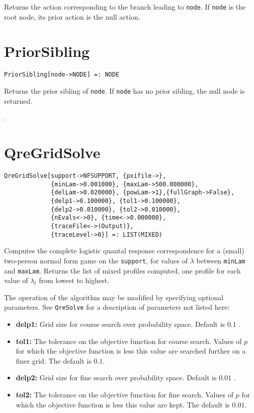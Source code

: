 \noindent
Returns the action corresponding to the branch leading to \verb+node+.
If \verb+node+ is the root node, its prior action is the null action.


\section*{PriorSibling}\label{PrimPriorSibling}
\begin{verbatim}
PriorSibling[node->NODE] =: NODE 
\end{verbatim}

\noindent
Returns the prior sibling of \verb+node+.  If \verb+node+ has
no prior sibling, the null node is returned.

\seealso {}.


\section*{QreGridSolve}\label{PrimQreGridSolve}
\begin{verbatim}
QreGridSolve[support->NFSUPPORT, {pxifile->}, 
             {minLam->0.001000}, {maxLam->500.000000}, 
             {delLam->0.020000}, {powLam->1},{fullGraph->False}, 
             {delp1->0.100000}, {tol1->0.100000}, 
             {delp2->0.010000}, {tol2->0.010000}, 
             {nEvals<->0}, {time<->0.000000}, 
             {traceFile<->(Output)}, 
             {traceLevel->0}] =: LIST(MIXED) 
\end{verbatim}

\noindent
Computes the complete logistic quantal response correspondence for a
(small) two-person normal form game on the \verb+support+, for values
of $\lambda$ between \texttt{minLam} and \texttt{maxLam}.  Returns the
list of mixed profiles computed, one profile for each value of
$\lambda_t$ from lowest to highest.

The operation of the algorithm may be modified by specifying optional
parameters.  See \verb+QreSolve+ for a description of parameters
not listed here:
\begin{itemize}
\item
\textbf{delp1:} Grid size for course search over probability space.  Default
is $0.1$ .
\item
\textbf{tol1:} The tolerance on the objective function for course search.
Values of $p$ for which the objective function is less this value are
searched further on a finer grid.  The default is $0.1$.
\item
\textbf{delp2:} Grid size for fine search over probability space.  Default is
$0.01$ .
\item
\textbf{tol2:} The tolerance on the objective function for fine search.
Values of $p$ for which the objective function is less this value are
kept.  The default is $0.01$.  
\end{itemize}

